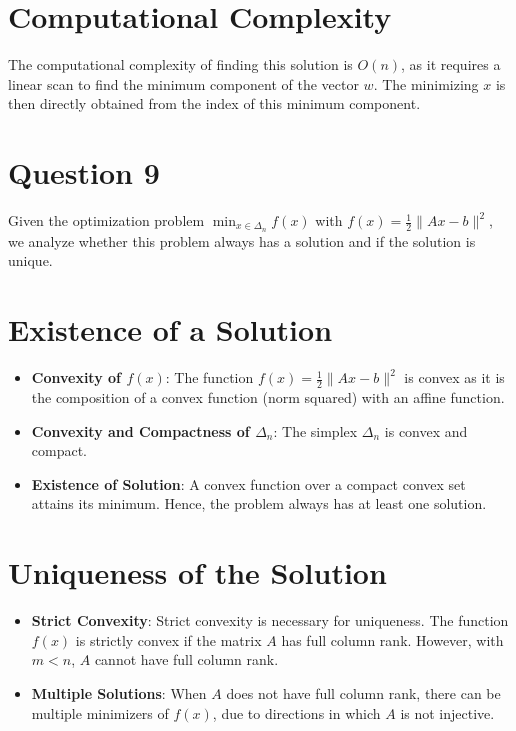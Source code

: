 \documentclass[12p]{article}
\begin{document}
\section*{Computational Complexity}
The computational complexity of finding this solution is \( O(n) \), as it requires a linear scan to find the minimum component of the vector \( w \). The minimizing \( x \) is then directly obtained from the index of this minimum component.


\section*{Question 9} 

Given the optimization problem \( \min_{x \in \Delta_n} f(x) \) with \( f(x) = \frac{1}{2} \|Ax - b\|^2 \), we analyze whether this problem always has a solution and if the solution is unique.

\section*{Existence of a Solution}
\begin{itemize}
    \item \textbf{Convexity of \( f(x) \)}: The function \( f(x) = \frac{1}{2} \|Ax - b\|^2 \) is convex as it is the composition of a convex function (norm squared) with an affine function.
    \item \textbf{Convexity and Compactness of \( \Delta_n \)}: The simplex \( \Delta_n \) is convex and compact.
    \item \textbf{Existence of Solution}: A convex function over a compact convex set attains its minimum. Hence, the problem always has at least one solution.
\end{itemize}

\section*{Uniqueness of the Solution}
\begin{itemize}
    \item \textbf{Strict Convexity}: Strict convexity is necessary for uniqueness. The function \( f(x) \) is strictly convex if the matrix \( A \) has full column rank. However, with \( m < n \), \( A \) cannot have full column rank.
    \item \textbf{Multiple Solutions}: When \( A \) does not have full column rank, there can be multiple minimizers of \( f(x) \), due to directions in which \( A \) is not injective.
\end{itemize}
\end{document}
